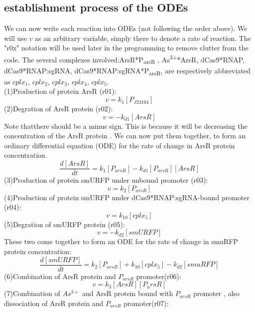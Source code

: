 \subsection{establishment process of the ODEs}
We can now write each reaction into ODEs (not following the order above). We will use $v$ as an arbitrary variable, simply there to denote a rate of reaction. The "r0x" notation will be used later in the programming to remove clutter from the code. The several complexes involved:ArsR*P\textsubscript{arsR} , As\textsuperscript{3+}*ArsR, dCas9*RNAP, dCas9*RNAP:sgRNA, dCas9*RNAP:sgRNA*P\textsubscript{arsR}, are respectively abbreviated as $cplx_1$, $cplx_2$, $cplx_3$, $cplx_4$, $cplx_5$.\\
(1)Production of protein ArsR (r01):
\begin{displaymath}
v=k_1[P_{J23104}]
\end{displaymath}
(2)Degration of ArsR protein (r02):
\begin{displaymath}
v=-k_{d1}[ArsR]
\end{displaymath}
Note thatthere should be a minus sign. This is because it will be decreasing the concentration of the ArsR protein . We can now put them together, to form an ordinary differential equation (ODE) for the rate of change in ArsR protein concentration.
\begin{equation}
\frac{d[ArsR]}{dt}=k_1[P_{arsR}]-k_{d1}[P_{arsR}][ArsR]\tag{1}
\end{equation}
(3)Production of protein smURFP under unbound promoter (r03):
\begin{displaymath}
v=k_2[P_{arsR}]
\end{displaymath}
(4)Production of protein smURFP under dCas9*RNAP:sgRNA-bound promoter (r04):
\begin{displaymath}
v=k_{10}[cplx_5]
\end{displaymath}
(5)Degration of smURFP protein (r05):
\begin{displaymath}
v=-k_{d2}[smURFP]
\end{displaymath}
These two come together to form an ODE for the rate of change in smuRFP protein concentration:
\begin{equation}
\frac{d[smURFP]}{dt}=k_2[P_{arsR}]+k_{10}[cplx_5]-k_{d2}[smuRFP]\tag{2}
\end{equation}
(6)Combination of ArsR protein and $P_{arsR}$ promoter(r06):
\begin{displaymath}
v=k_3[ArsR][P_arsR]
\end{displaymath}
(7)Combination of $As^{3+}$ and ArsR protein bound with $P_{arsR}$ promoter , also dissociation of ArsR protein and $P_{arsR}$ promoter(r07):
